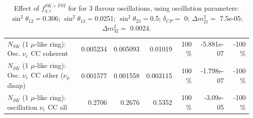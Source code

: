 \begin{table}
\begin{tabular}{| l | r | r | r  r | r  r |}
                          $N_{SK}$ (1 $\mu$-like ring): Osc. $\nu_e$ CC coherent &        0.005234 &        0.005093 &         0.01019 &      100 \%  &      -5.881e-07 &     -100 \%  \\ 
           $N_{SK}$ (1 $\mu$-like ring): Osc. $\nu_e$ CC other ($\nu_\mu$ disap) &        0.001577 &        0.001558 &        0.003115 &      100 \%  &      -1.798e-07 &     -100 \%  \\ 
                        $N_{SK}$ (1 $\mu$-like ring): oscillation $\nu_e$ CC all &          0.2706 &          0.2676 &          0.5352 &      100 \%  &       -3.09e-05 &     -100 \%  \\ 
\hline
\hline
\end{tabular}
\caption{ Effect of $f_{4; r}^{SK+FSI}$ for for 3 flavour oscillations, using oscillation parameters:  $\sin^2\theta_{12} = $0.306; $\sin^2\theta_{13} = $0.0251; $\sin^2\theta_{23} = $0.5; $\delta_{CP} = $        0; $\Delta m^2_{21} = $    7.5e-05; $\Delta m^2_{32} = $    0.0024. }
\label{tab:num_skdetfsi_004_1RmuT_3f_osc_t13:0.0251_spectralreco_spectraltrue}
\end{table}
\clearpage
